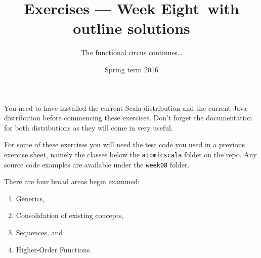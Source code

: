 \documentclass[a4paper,12pt,answers]{exam}
\title{Exercises --- Week Eight}
\title{\tit \ with outline solutions}
\title{\tit}
\date{Spring term 2016}
\author{The functional circus continues\ldots}
\begin{document}
\maketitle

You need to have installed the current Scala distribution and the current Java distribution
before commencing these exercises.
Don't forget the documentation for both distributions as they will come in very useful.

For some of these exercises you will need the test code you used in a previous exercise sheet,
namely the classes below the \verb!atomicscala! folder on the repo. Any source code examples
are available under the \verb!week08! folder.

There are four broad areas begin examined:
\begin{enumerate}
\item Generics,
\item Consolidation of existing concepts,
\item Sequences, and	
\item Higher-Order Functions.
\end{enumerate}
\end{document}
